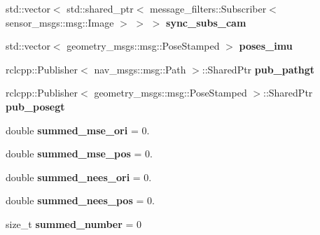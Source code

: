 \begin{DoxyCompactItemize}
\item 
\mbox{\label{classov__msckf_1_1ROS2Visualizer_ae84b0fb63a43981710b64390696c21f7}} 
std\+::vector$<$ std\+::shared\+\_\+ptr$<$ message\+\_\+filters\+::\+Subscriber$<$ sensor\+\_\+msgs\+::msg\+::\+Image $>$ $>$ $>$ {\bfseries sync\+\_\+subs\+\_\+cam}
\item 
\mbox{\label{classov__msckf_1_1ROS2Visualizer_a66bae94ad145bd3e168f17beb2b4891c}} 
std\+::vector$<$ geometry\+\_\+msgs\+::msg\+::\+Pose\+Stamped $>$ {\bfseries poses\+\_\+imu}
\item 
\mbox{\label{classov__msckf_1_1ROS2Visualizer_a7d659f2530367ff33e43901366bdbcc8}} 
rclcpp\+::\+Publisher$<$ nav\+\_\+msgs\+::msg\+::\+Path $>$\+::Shared\+Ptr {\bfseries pub\+\_\+pathgt}
\item 
\mbox{\label{classov__msckf_1_1ROS2Visualizer_a09aeb6680574294a63effb9191d2d97d}} 
rclcpp\+::\+Publisher$<$ geometry\+\_\+msgs\+::msg\+::\+Pose\+Stamped $>$\+::Shared\+Ptr {\bfseries pub\+\_\+posegt}
\item 
\mbox{\label{classov__msckf_1_1ROS2Visualizer_a89cbd77dafb79ad4c5d2086e3c4b68f9}} 
double {\bfseries summed\+\_\+mse\+\_\+ori} = 0.
\item 
\mbox{\label{classov__msckf_1_1ROS2Visualizer_aed1dbfeaad3a08c16afa66f97123b9c6}} 
double {\bfseries summed\+\_\+mse\+\_\+pos} = 0.
\item 
\mbox{\label{classov__msckf_1_1ROS2Visualizer_a788f3f83eb05d9c832e1643e214fb05c}} 
double {\bfseries summed\+\_\+nees\+\_\+ori} = 0.
\item 
\mbox{\label{classov__msckf_1_1ROS2Visualizer_a3572a462a242fcb91cb396dc96d0d974}} 
double {\bfseries summed\+\_\+nees\+\_\+pos} = 0.
\item 
\mbox{\label{classov__msckf_1_1ROS2Visualizer_a3aad6d74063bce26b29abb1d489f1e54}} 
size\+\_\+t {\bfseries summed\+\_\+number} = 0

\end{DoxyCompactItemize}
